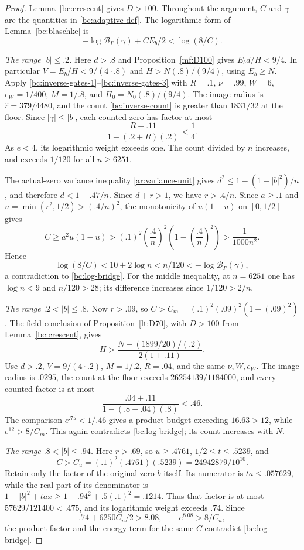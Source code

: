 \begin{proof}
Lemma~\ref{bc:crescent} gives $D>100$.  Throughout the argument,
$C$ and $\gamma$ are the quantities in \eqref{bc:adaptive-def}.
The logarithmic form of Lemma~\ref{bc:blaschke} is
\begin{equation}\label{bc:log-bridge}
 -\log\mathcal B_P(\gamma)+CE_b/2<\log(8/C).
\end{equation}

\emph{The range $|b|\leq.2$.}
Here $d>.8$ and Proposition~\ref{mf:D100} gives
$E_bd/H<9/4$.  In particular
$V=E_b/H<9/(4\cdot.8)$ and
$H>N(.8)/(9/4)$, using $E_b\geq N$.
Apply \eqref{bc:inverse-gates-1}--\eqref{bc:inverse-gates-3}
with $R=.1$, $\nu=.99$, $W=6$, $e_W=1/400$,
$M=1/.8$, and $H_0=N_0(.8)/(9/4)$.
The image radius is $\widehat r=379/4480$, and the count
\eqref{bc:inverse-count} is greater than $1831/32$ at the floor.
Since $|\gamma|\leq|b|$, each counted zero has factor at most
\[
 \frac{R+.11}{1-(.2+R)(.2)}<\frac14.
\]
As $e<4$, its logarithmic weight exceeds one.
The count divided by $n$ increases, and exceeds $1/120$ for all
$n\geq6251$.

The actual-zero variance inequality \eqref{ar:variance-unit}
gives $d^2\leq1-(1-|b|^2)/n$, and therefore $d<1-.47/n$.
Since $d+r>1$, we have $r>.4/n$.
Since $a\geq.1$ and $u=\min(r^2,1/2)>(.4/n)^2$,
the monotonicity of $u(1-u)$ on $[0,1/2]$ gives
\[
 C\geq a^2u(1-u)
 >(.1)^2\left(\frac{.4}{n}\right)^2
       \left(1-\left(\frac{.4}{n}\right)^2\right)
 >\frac1{1000n^2}.
\]
Hence
\[
 \log(8/C)<10+2\log n<n/120
       <-\log\mathcal B_P(\gamma),
\]
a contradiction to \eqref{bc:log-bridge}.
For the middle inequality, at $n=6251$ one has
$\log n<9$ and $n/120>28$; its difference increases since
$1/120>2/n$.

\emph{The range $.2<|b|\leq.8$.}
Now $r>.09$, so
$C>C_m=(.1)^2(.09)^2(1-(.09)^2)$.
The field conclusion of Proposition~\ref{lt:D70}, with $D>100$
from Lemma~\ref{bc:crescent}, gives
\[
 H>\frac{N-(1899/20)/(.2)}{2(1+.11)}.
\]
Use $d>.2$, $V=9/(4\cdot.2)$, $M=1/.2$,
$R=.04$, and the same $\nu,W,e_W$.
The image radius is $.0295$, the count at the floor exceeds
$26254139/1184000$, and every counted factor is at most
\[
 \frac{.04+.11}{1-(.8+.04)(.8)}<.46.
\]
The comparison $e^{.75}<1/.46$ gives a product budget exceeding
$16.63>12$, while $e^{12}>8/C_m$.
This again contradicts \eqref{bc:log-bridge}; its count increases
with $N$.

\emph{The range $.8<|b|\leq.94$.}
Here $r>.69$, so $u\geq.4761$, $1/2\leq t\leq.5239$, and
\[
 C>C_u=(.1)^2(.4761)(.5239)=24942879/10^{10}.
\]
Retain only the factor of the original zero $b$ itself.
Its numerator is $ta\leq.057629$, while the real part of its
denominator is
$1-|b|^2+tax\geq1-.94^2+.5(.1)^2=.1214$.
Thus that factor is at most $57629/121400<.475$, and its logarithmic
weight exceeds $.74$.  Since
\[
 .74+6250C_u/2>8.08,\qquad e^{8.08}>8/C_u,
\]
the product factor and the energy term for the same $C$ contradict
\eqref{bc:log-bridge}.


\end{proof}
